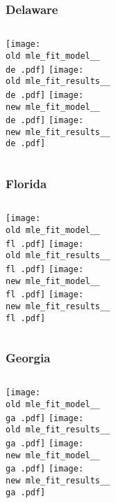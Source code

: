\documentclass{beamer}
\newcommand{\old}{current_two_stage_output/pyseir/state_summaries/reports/}
\newcommand{\new}{new_shortest_t_delta/pyseir/state_summaries/reports/}
\newcommand{\de}{Delaware__10}
\newcommand{\fl}{Florida__12}
\newcommand{\ga}{Georgia__13}
\begin{document}
\begin{frame}
\frametitle{Delaware}
    \begin{columns}[t]
       \texttt{[image: \\old mle\_fit\_model\_\_\\de .pdf]}
       \texttt{[image: \\old mle\_fit\_results\_\_\\de .pdf]}   
       \texttt{[image: \\new mle\_fit\_model\_\_\\de .pdf]}
       \texttt{[image: \\new mle\_fit\_results\_\_\\de .pdf]}   
\end{columns}
\end{frame}


\begin{frame}
\frametitle{Florida}
    \begin{columns}[t]
       \texttt{[image: \\old mle\_fit\_model\_\_\\fl .pdf]}
       \texttt{[image: \\old mle\_fit\_results\_\_\\fl .pdf]}   
       \texttt{[image: \\new mle\_fit\_model\_\_\\fl .pdf]}
       \texttt{[image: \\new mle\_fit\_results\_\_\\fl .pdf]}   
\end{columns}
\end{frame}

\begin{frame}
\frametitle{Georgia}
    \begin{columns}[t]

       \texttt{[image: \\old mle\_fit\_model\_\_\\ga .pdf]}
       \texttt{[image: \\old mle\_fit\_results\_\_\\ga .pdf]}   
       \texttt{[image: \\new mle\_fit\_model\_\_\\ga .pdf]}
       \texttt{[image: \\new mle\_fit\_results\_\_\\ga .pdf]}   
       
\end{columns}
\end{frame}
\end{document}
